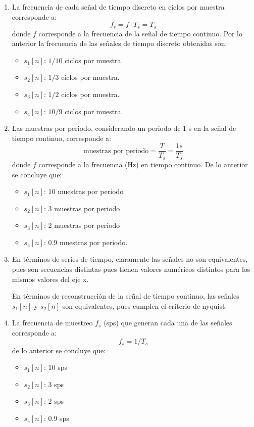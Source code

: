 \begin{enumerate}
    \item La frecuencia de cada señal de tiempo discreto en ciclos por muestra corresponde a:
    $$ f_r = f \cdot T_s = T_s$$
    donde $f$ corresponde a la frecuencia de la señal de tiempo continuo.
    Por lo anterior la frecuencia de las señales de tiempo discreto obtenidas son:
    
    \begin{itemize}
        \item $s_1[n]$: $1/10$ ciclos por muestra.
        \item $s_2[n]$: $1/3$ ciclos por muestra.
        \item $s_3[n]$: $1/2$ ciclos por muestra. 
        \item $s_4[n]$: $10/9$ ciclos por muestra.
    \end{itemize}
    
    \item Las muestras por periodo, considerando un periodo de 1 s en la señal de tiempo continuo, corresponde a:
    $$ \text{muestras por periodo}  = \dfrac{T}{T_s} = \dfrac{1 s}{ T_s} $$
    donde $f$ corresponde a la frecuencia (Hz) en tiempo continuo. De lo anterior se concluye que:
    
    \begin{itemize}
        \item $s_1[n]$: 10 muestras por periodo
        \item $s_2[n]$: 3 muestras por periodo
        \item $s_3[n]$: 2 muestras por periodo
        \item $s_4[n]$: 0.9 muestras por periodo.
    \end{itemize}
    
    \item En términos de series de tiempo, claramente las señales no son equivalentes, pues son secuencias distintas pues tienen valores numéricos distintos para los mismos valores del eje x.
    
    En términos de reconstrucción de la señal de tiempo continuo, las señales $s_1[n]$ y $s_2[n]$ son equivalentes, pues cumplen el criterio de nyquist.
    
    \item La frecuencia de muestreo $f_s$ (sps) que generan cada una de las señales corresponde a:
    $$ f_s = 1/T_s$$
    de lo anterior se concluye que:
    
    \begin{itemize}
        \item $s_1[n]$: 10 sps
        \item $s_2[n]$: 3 sps
        \item $s_3[n]$: 2 sps
        \item $s_4[n]$: 0.9 sps
    \end{itemize}
    

\end{enumerate}

